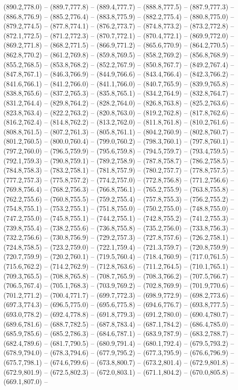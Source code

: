 (890.2,778.0) -- (889.7,777.8) -- (889.4,777.7) -- (888.8,777.5) -- (887.9,777.3) -- (886.8,776.9) -- (885.2,776.4) -- (883.8,775.9) -- (882.2,775.4) -- (880.8,775.0) -- (879.2,774.5) -- (877.8,774.1) -- (876.2,773.7) -- (874.8,773.2) -- (873.2,772.8) -- (872.1,772.5) -- (871.2,772.3) -- (870.7,772.1) -- (870.4,772.1) -- (869.9,772.0) -- (869.2,771.8) -- (868.2,771.5) -- (866.9,771.2) -- (865.6,770.9) -- (864.2,770.5) -- (862.8,770.2) -- (861.2,769.8) -- (859.8,769.5) -- (858.2,769.2) -- (856.8,768.9) -- (855.2,768.5) -- (853.8,768.2) -- (852.2,767.9) -- (850.8,767.7) -- (849.2,767.4) -- (847.8,767.1) -- (846.3,766.9) -- (844.9,766.6) -- (843.4,766.4) -- (842.3,766.2) -- (841.6,766.1) -- (841.2,766.0) -- (841.1,766.0) -- (840.7,765.9) -- (839.9,765.8) -- (838.8,765.6) -- (837.2,765.3) -- (835.8,765.1) -- (834.2,764.9) -- (832.8,764.7) -- (831.2,764.4) -- (829.8,764.2) -- (828.2,764.0) -- (826.8,763.8) -- (825.2,763.6) -- (823.8,763.4) -- (822.2,763.2) -- (820.8,763.0) -- (819.2,762.8) -- (817.8,762.6) -- (816.2,762.4) -- (814.8,762.2) -- (813.2,762.0) -- (811.8,761.8) -- (810.2,761.6) -- (808.8,761.5) -- (807.2,761.3) -- (805.8,761.1) -- (804.2,760.9) -- (802.8,760.7) -- (801.2,760.5) -- (800.0,760.4) -- (799.0,760.2) -- (798.3,760.1) -- (797.8,760.1) -- (797.2,760.0) -- (796.5,759.9) -- (795.6,759.8) -- (794.5,759.7) -- (793.4,759.5) -- (792.1,759.3) -- (790.8,759.1) -- (789.2,758.9) -- (787.8,758.7) -- (786.2,758.5) -- (784.8,758.3) -- (783.2,758.1) -- (781.8,757.9) -- (780.2,757.7) -- (778.8,757.5) -- (777.2,757.3) -- (775.8,757.2) -- (774.2,757.0) -- (772.8,756.8) -- (771.2,756.6) -- (769.8,756.4) -- (768.2,756.3) -- (766.8,756.1) -- (765.2,755.9) -- (763.8,755.8) -- (762.2,755.6) -- (760.8,755.5) -- (759.2,755.4) -- (757.8,755.3) -- (756.2,755.2) -- (754.8,755.1) -- (753.2,755.1) -- (751.8,755.0) -- (750.2,755.0) -- (748.8,755.0) -- (747.2,755.0) -- (745.8,755.1) -- (744.2,755.1) -- (742.8,755.2) -- (741.2,755.3) -- (739.8,755.4) -- (738.2,755.6) -- (736.8,755.8) -- (735.2,756.0) -- (733.8,756.3) -- (732.2,756.6) -- (730.8,756.9) -- (729.2,757.3) -- (727.8,757.6) -- (726.2,758.1) -- (724.8,758.5) -- (723.2,759.0) -- (722.1,759.4) -- (721.3,759.7) -- (720.8,759.9) -- (720.7,759.9) -- (720.2,760.1) -- (719.5,760.4) -- (718.4,760.9) -- (717.0,761.5) -- (715.6,762.2) -- (714.2,762.9) -- (712.8,763.6) -- (711.2,764.5) -- (710.1,765.1) -- (709.3,765.5) -- (708.8,765.8) -- (708.7,765.9) -- (708.3,766.2) -- (707.5,766.7) -- (706.5,767.4) -- (705.1,768.3) -- (703.9,769.2) -- (702.8,769.9) -- (701.9,770.6) -- (701.2,771.2) -- (700.4,771.7) -- (699.7,772.3) -- (698.9,772.9) -- (698.2,773.6) -- (697.3,774.3) -- (696.5,775.0) -- (695.6,775.8) -- (694.6,776.7) -- (693.8,777.5) -- (693.0,778.2) -- (692.4,778.8) -- (691.8,779.3) -- (691.2,780.0) -- (690.4,780.7) -- (689.6,781.6) -- (688.7,782.5) -- (687.8,783.4) -- (687.1,784.2) -- (686.4,785.0) -- (685.9,785.6) -- (685.2,786.3) -- (684.6,787.1) -- (683.9,787.9) -- (683.2,788.7) -- (682.4,789.6) -- (681.7,790.5) -- (680.9,791.4) -- (680.1,792.4) -- (679.5,793.2) -- (678.9,794.0) -- (678.3,794.6) -- (677.9,795.2) -- (677.3,795.9) -- (676.6,796.9) -- (675.7,798.1) -- (674.6,799.6) -- (673.8,800.7) -- (673.2,801.4) -- (672.9,801.8) -- (672.9,801.9) -- (672.5,802.3) -- (672.0,803.1) -- (671.1,804.2) -- (670.0,805.8) -- (669.1,807.0) -- 